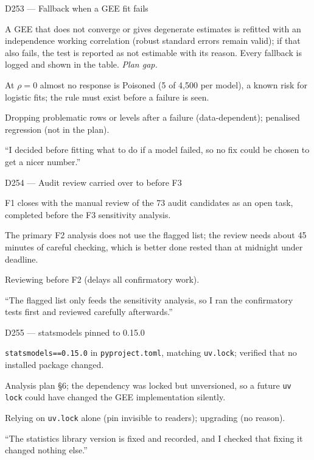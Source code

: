 \documentclass[11pt,a4paper]{report}
\begin{document}
\begin{decisionbox}{D253 --- Fallback when a GEE fit fails}
\begin{description}[nosep, leftmargin=0pt]
  \item[Decision.] A GEE that does not converge or gives degenerate estimates is refitted with an independence working correlation (robust standard errors remain valid); if that also fails, the test is reported as not estimable with its reason. Every fallback is logged and shown in the table. \emph{Plan gap.}
  \item[Why.] At $\rho=0$ almost no response is Poisoned (5 of 4{,}500 per model), a known risk for logistic fits; the rule must exist before a failure is seen.
  \item[Alternatives.] Dropping problematic rows or levels after a failure (data-dependent); penalised regression (not in the plan).
  \item[Interview line.] ``I decided before fitting what to do if a model failed, so no fix could be chosen to get a nicer number.''
\end{description}
\end{decisionbox}

\begin{decisionbox}{D254 --- Audit review carried over to before F3}
\begin{description}[nosep, leftmargin=0pt]
  \item[Decision.] F1 closes with the manual review of the 73 audit candidates as an open task, completed before the F3 sensitivity analysis.
  \item[Why.] The primary F2 analysis does not use the flagged list; the review needs about 45 minutes of careful checking, which is better done rested than at midnight under deadline.
  \item[Alternatives.] Reviewing before F2 (delays all confirmatory work).
  \item[Interview line.] ``The flagged list only feeds the sensitivity analysis, so I ran the confirmatory tests first and reviewed carefully afterwards.''
\end{description}
\end{decisionbox}

\begin{decisionbox}{D255 --- statsmodels pinned to 0.15.0}
\begin{description}[nosep, leftmargin=0pt]
  \item[Decision.] \texttt{statsmodels==0.15.0} in \texttt{pyproject.toml}, matching \texttt{uv.lock}; verified that no installed package changed.
  \item[Why.] Analysis plan \S6; the dependency was locked but unversioned, so a future \texttt{uv lock} could have changed the GEE implementation silently.
  \item[Alternatives.] Relying on \texttt{uv.lock} alone (pin invisible to readers); upgrading (no reason).
  \item[Interview line.] ``The statistics library version is fixed and recorded, and I checked that fixing it changed nothing else.''
\end{description}
\end{decisionbox}
\end{document}
